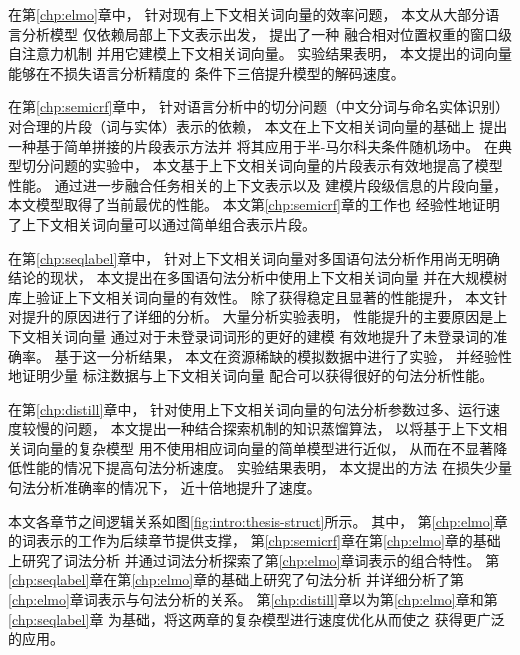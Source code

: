在第\ref{chp:elmo}章中，
针对现有上下文相关词向量的效率问题，
本文从大部分语言分析模型
仅依赖局部上下文表示出发，
提出了一种
融合相对位置权重的窗口级自注意力机制
并用它建模上下文相关词向量。
实验结果表明，
本文提出的词向量
能够在不损失语言分析精度的
条件下三倍提升模型的解码速度。

在第\ref{chp:semicrf}章中，
针对语言分析中的切分问题（中文分词与命名实体识别）
对合理的片段（词与实体）表示的依赖，
本文在上下文相关词向量的基础上
提出一种基于简单拼接的片段表示方法并
将其应用于半-马尔科夫条件随机场中。
在典型切分问题的实验中，
本文基于上下文相关词向量的片段表示有效地提高了模型性能。
通过进一步融合任务相关的上下文表示以及
建模片段级信息的片段向量，本文模型取得了当前最优的性能。
本文第\ref{chp:semicrf}章的工作也
经验性地证明了上下文相关词向量可以通过简单组合表示片段。

在第\ref{chp:seqlabel}章中，
针对上下文相关词向量对多国语句法分析作用尚无明确结论的现状，
本文提出在多国语句法分析中使用上下文相关词向量
并在大规模树库上验证上下文相关词向量的有效性。
除了获得稳定且显著的性能提升，
本文针对提升的原因进行了详细的分析。
大量分析实验表明，
性能提升的主要原因是上下文相关词向量
通过对于未登录词词形的更好的建模
有效地提升了未登录词的准确率。
基于这一分析结果，
本文在资源稀缺的模拟数据中进行了实验，
并经验性地证明少量
标注数据与上下文相关词向量
配合可以获得很好的句法分析性能。

在第\ref{chp:distill}章中，
针对使用上下文相关词向量的句法分析参数过多、运行速度较慢的问题，
本文提出一种结合探索机制的知识蒸馏算法，
以将基于上下文相关词向量的复杂模型
用不使用相应词向量的简单模型进行近似，
从而在不显著降低性能的情况下提高句法分析速度。
实验结果表明，
本文提出的方法
在损失少量句法分析准确率的情况下，
近十倍地提升了速度。

本文各章节之间逻辑关系如图\ref{fig:intro:thesis-struct}所示。
其中，
第\ref{chp:elmo}章的词表示的工作为后续章节提供支撑，
第\ref{chp:semicrf}章在第\ref{chp:elmo}章的基础上研究了词法分析
并通过词法分析探索了第\ref{chp:elmo}章词表示的组合特性。
第\ref{chp:seqlabel}章在第\ref{chp:elmo}章的基础上研究了句法分析
并详细分析了第\ref{chp:elmo}章词表示与句法分析的关系。
第\ref{chp:distill}章以为第\ref{chp:elmo}章和第\ref{chp:seqlabel}章
为基础，将这两章的复杂模型进行速度优化从而使之
获得更广泛的应用。